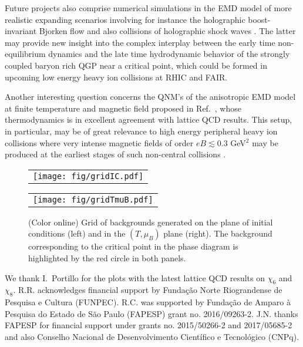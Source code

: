 \documentclass[aps,prd,showkeys,superscriptaddress,singlecolumn,nofootinbib,floatfix]{revtex4-1}
\begin{document}
Future projects also comprise numerical simulations in the EMD model of more realistic expanding scenarios involving for instance the holographic boost-invariant Bjorken flow \cite{Chesler:2009cy,Heller:2011ju,Jankowski:2014lna,Romatschke:2017vte,Spalinski:2017mel,Critelli:2018osu} and also collisions of holographic shock waves \cite{Chesler:2010bi,Casalderrey-Solana:2013aba,vanderSchee:2013pia,Chesler:2015bba,Chesler:2016ceu,Attems:2016tby,Casalderrey-Solana:2016xfq,Attems:2017zam}. The latter may provide new insight into the complex interplay between the early time non-equilibrium dynamics and the late time hydrodynamic behavior of the strongly coupled baryon rich QGP near a critical point, which could be formed in upcoming low energy heavy ion collisions at RHIC and FAIR.

Another interesting question concerns the QNM's of the anisotropic EMD model at finite temperature and magnetic field proposed in Ref.\ \cite{Finazzo:2016mhm}, whose thermodynamics is in excellent agreement with lattice QCD results. This setup, in particular, may be of great relevance to high energy peripheral heavy ion collisions where very intense magnetic fields of order $eB\lesssim 0.3$ GeV$^2$ may be produced at the earliest stages of such non-central collisions \cite{Skokov:2009qp}.

\begin{figure*}
\begin{center}
\begin{tabular}{c}
\texttt{[image: fig/gridIC.pdf]} %
\end{tabular}
\begin{tabular}{c}
\texttt{[image: fig/gridTmuB.pdf]} %
\end{tabular}
\end{center}
\caption{{\small (Color online) Grid of backgrounds generated on the plane of initial conditions (left) and in the $(T,\mu_B)$ plane (right). The background corresponding to the critical point in the phase diagram is highlighted by the red circle in both panels.}
\label{fig:grid}}
\end{figure*}




\begin{acknowledgments}
We thank I.~Portillo for the plots with the latest lattice QCD results on $\chi_6$ and $\chi_8$. R.R. acknowledges financial support by Funda\c c\~ao Norte Riograndense de Pesquisa e Cultura (FUNPEC). R.C. was supported by Funda\c c\~ao de Amparo \`a Pesquisa do Estado de S\~ao Paulo (FAPESP) grant no. 2016/09263-2. J.N. thanks FAPESP for financial support under grants no. 2015/50266-2 and  2017/05685-2 and also Conselho Nacional de Desenvolvimento Cient\'ifico e Tecnol\'ogico (CNPq).
\end{acknowledgments}
\end{document}
